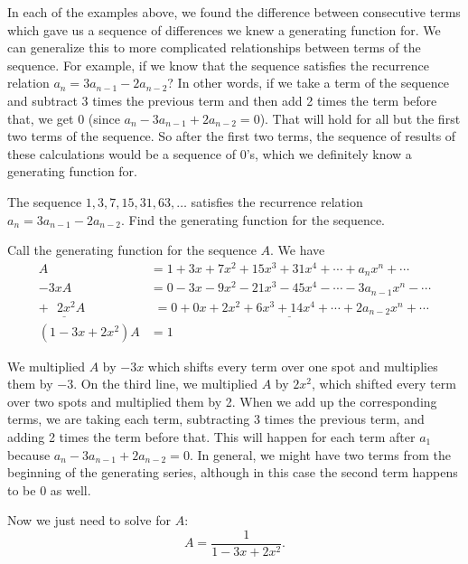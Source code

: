\documentclass[12pt]{article}
\begin{document}
  
In each of the examples above, we found the difference between consecutive terms which gave us a sequence of differences we knew a generating function for.  We can generalize this to more complicated relationships between terms of the sequence.  For example, if we know that the sequence satisfies the recurrence relation $a_n = 3a_{n-1} - 2a_{n-2}$?  In other words, if we take a term of the sequence and subtract 3 times the previous term and then add 2 times the term before that, we get 0 (since $a_n - 3a_{n-1} + 2a_{n-2} = 0$).  That will hold for all but the first two terms of the sequence.  So after the first two terms, the sequence of results of these calculations would be a sequence of 0's, which we definitely know a generating function for.

\begin{example}
 The sequence $1, 3, 7, 15, 31, 63, \ldots$ satisfies the recurrence relation $a_n = 3a_{n-1} - 2a_{n-2}$.  Find the generating function for the sequence.
 
 \begin{solution}
  Call the generating function for the sequence $A$.  We have 
  \begin{align*}
   A & = 1 + 3x + 7x^2 + 15x^3 + 31x^4 + \cdots + a_nx^n + \cdots \\
   -3xA & = 0 - 3x - 9x^2 - 21x^3 - 45x^4 - \cdots - 3a_{n-1}x^n - \cdots \\
   \underline{+~~~2x^2A_{~}^{~^{~}}} & \underline{\,\, = 0 + 0x + 2x^2 + 6x^3 + 14x^4 + \cdots + 2a_{n-2}x^n + \cdots} \\
   (1-3x+2x^2)A & = 1
  \end{align*}
  
  
  We multiplied $A$ by $-3x$ which shifts every term over one spot and multiplies them by $-3$.  On the third line, we multiplied $A$ by $2x^2$, which shifted every term over two spots and multiplied them by 2.  When we add up the corresponding terms, we are taking each term, subtracting 3 times the previous term, and adding 2 times the term before that.  This will happen for each term after $a_1$ because $a_n - 3a_{n-1} + 2a_{n-2} = 0$.  In general, we might have two terms from the beginning of the generating series, although in this case the second term happens to be 0 as well.
  
  Now we just need to solve for $A$:
  \[A = \frac{1}{1 - 3x + 2x^2}.\]
 \end{solution}

\end{example}
\end{document}
